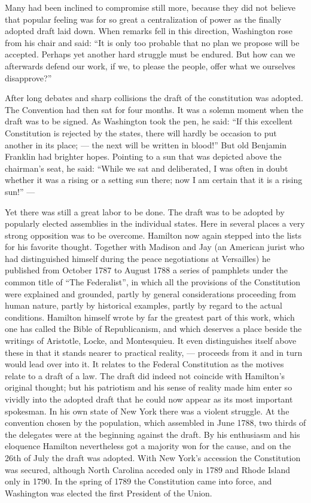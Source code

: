 \documentclass[12pt,a4paper,openany]{book}
\newcommand{\opage}[1]{\marginnote{\footnotesize\textit{[#1]}}}
\begin{document}
Many had been inclined to compromise still more, because they did not believe that popular feeling was for so
great a centralization of power as the finally adopted
draft laid down. When remarks fell in this direction,
Washington rose from his chair and said: ``It
is only too probable that no plan we propose will be
accepted. Perhaps yet another hard struggle must be endured. But
how can we afterwards defend our work, if we,
to please the people, offer what we ourselves disapprove?''

After long debates and sharp collisions the draft of the constitution
was adopted. The Convention had then sat for four months.
It was a solemn moment when the draft was to be signed.
As Washington took the pen, he said: ``If this
excellent Constitution is rejected by the states, there will hardly
be occasion to put another in its place; --- the
next will be written in blood!'' But old Benjamin
Franklin had brighter hopes. Pointing to
a sun that was depicted above the chairman's seat, he said:
``While we sat and deliberated, I was often in doubt whether it
was a rising or a setting sun there; now I am certain
that it is a rising sun!'' ---

Yet there was still a great labor to be done. The draft
was to be adopted by popularly elected assemblies in the individual
states. Here in several places a very strong opposition
was to be overcome. Hamilton now again stepped into the lists for
his favorite thought. Together with Madison and Jay (an
American jurist who had distinguished himself during the
peace negotiations at Versailles) he published from October 1787 to
August 1788 a series of pamphlets under the common title of
``The Federalist'', in which all the provisions of the Constitution were
explained %
and grounded, partly by general considerations proceeding from
human nature, partly by historical examples, partly by regard to the actual conditions. Hamilton
himself wrote by far the greatest part of this work, which
one has called the Bible of Republicanism, and which deserves
\opage{132}a place beside the writings of Aristotle, Locke, and Montesquieu.
It even distinguishes itself above these in that
it stands nearer to practical reality, --- proceeds from
it and in turn would lead over into it. It relates to
the Federal Constitution as the motives relate to a draft of a law.
The draft did indeed not coincide with Hamilton's original thought;
but his patriotism and his sense of reality made him
enter so vividly into the adopted draft that he
could now appear as its most important spokesman. In his own
state of New York there was a violent struggle. At the convention chosen by the
population, which assembled in June 1788, two thirds of the
delegates were at the beginning against the draft.
By his enthusiasm and his eloquence Hamilton nevertheless got a
majority won for the cause, and on the 26th of July the draft was
adopted. With New York's accession the Constitution was secured,
although North Carolina acceded only in 1789 and Rhode Island
only in 1790. In the spring of 1789 the Constitution came into force,
and Washington was elected the first President of the Union.
\end{document}
